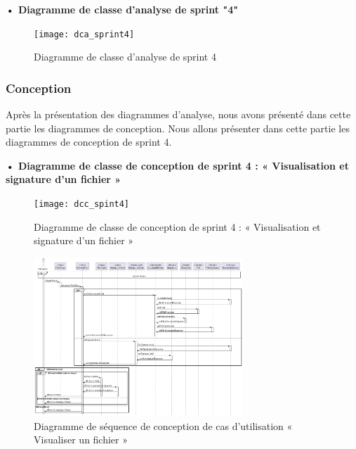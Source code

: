 \textbf{•	Diagramme de classe d'analyse de sprint "4" }

\begin{figure}[H]
  \centering
  \texttt{[image: dca\_sprint4]}
  \caption{Diagramme de classe d'analyse de sprint 4}
  \label{fig:class_analyse_4}
\end{figure}



\subsubsection{Conception}

Après la présentation des diagrammes d'analyse, nous avons présenté dans cette partie les diagrammes de conception.
Nous allons présenter dans cette partie les diagrammes de conception de sprint 4.
\newpage 
\begin{landscape}

\textbf{•	Diagramme de classe de conception de sprint 4 : « Visualisation et signature d'un fichier »}

\begin{figure}[H]
  \centering
  \texttt{[image: dcc\_spint4]}
  \caption{Diagramme de classe de conception de sprint 4 : « Visualisation et signature d'un fichier »}
  \label{fig:class_diagram_4}
\end{figure}
\end{landscape}
\newpage


\begin{figure}[H]
  \centering
  \includegraphics[width=0.7\textwidth]{out/diagrams/sprint4/sequence_view_file/sequence_view_file}
  \caption{Diagramme de séquence de conception de cas d'utilisation « Visualiser un fichier »}
  \label{fig:sequence_conception_view_file}
\end{figure}

